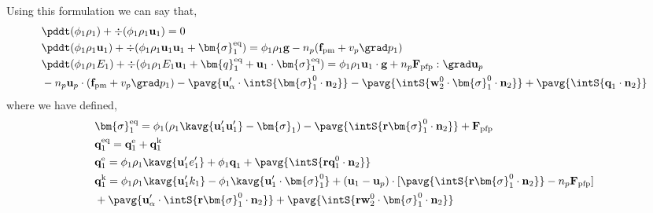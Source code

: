 Using this formulation we can say that, 
\begin{align}
    \label{eq:dt_avg_rho}
    &\pddt (\phi_1 \rho_1)  
    + \div (
        \phi_1 \rho_1\textbf{u}_1
    )
    = 
    0\\
    \label{eq:dt_avg_rhou_1}
    &\pddt (\phi_1 \rho_1\textbf{u}_1)  
    + \div (
        \phi_1 \rho_1\textbf{u}_1\textbf{u}_1
        + \bm{\sigma}_1^\text{eq}
    )
    = 
    \phi_1 \rho_1 \textbf{g} 
    - n_p (\textbf{f}_\text{pm} + v_p \grad p_1)
    \\
    \label{eq:dt_avg_rhoE_1}
    &\pddt (\phi_1\rho_1E_1)  
    + \div (
        \phi_1\rho_1E_1\textbf{u}_1
        + \bm{q}_1^\text{eq}
        + \textbf{u}_1 \cdot \bm{\sigma}_1^\text{eq}
        )
    = 
    \phi_1 \rho_1\textbf{u}_1 \cdot \textbf{g} 
    +n_p\textbf{F}_\text{pfp}:\grad \textbf{u}_p\\
    &
    - n_p \textbf{u}_p \cdot (\textbf{f}_\text{pm} + v_p \grad p_1)
    - \pavg{ \textbf{u}_\alpha' \cdot \intS{  \bm{\sigma}_1^0 \cdot \textbf{n}_2}}
    - \pavg{ \intS{\textbf{w}_2^0 \cdot \bm{\sigma}_1^0 \cdot \textbf{n}_2}}
    + \pavg{\intS{\textbf{q}_1\cdot \textbf{n}_2}}
\end{align} 
where we have defined, 
\begin{align*}
    &\bm{\sigma}_1^\text{eq}
    = \phi_1 (
        \rho_1\kavg{\textbf{u}_1'\textbf{u}_1'}
        -\bm{\sigma}_1%
        )  
        - \pavg{\intS{\textbf{r}\bm{\sigma}_1^0 \cdot \textbf{n}_2}}
        + \textbf{F}_\text{pfp}\\
    &\textbf{q}_1^\text{eq}
    =\textbf{q}_1^\text{e} +\textbf{q}_1^\text{k}  \\
    &\textbf{q}_1^\text{e}
    = \phi_1\rho_1 \kavg{\textbf{u}_1' e_1'} 
    + \phi_1\textbf{q}_1 
    +\pavg{\intS{\textbf{r}\textbf{q}_1^0 \cdot \textbf{n}_2}} 
    \\
    &\textbf{q}_1^\text{k}
    = \phi_1\rho_1 \kavg{\textbf{u}_1' k_1} 
    - \phi_1\kavg{\textbf{u}_1' \cdot \bm{\sigma}_1^0}
    + (\textbf{u}_1 - \textbf{u}_p)\cdot[
    \pavg{\intS{\textbf{r}\bm{\sigma}_1^0 \cdot \textbf{n}_2}}
     - n_p \textbf{F}_\text{pfp}]
    \\
    &+ \pavg{ \textbf{u}_\alpha' \cdot \intS{ \textbf{r} \bm{\sigma}_1^0 \cdot \textbf{n}_2}}
    + \pavg{ \intS{\textbf{r}\textbf{w}_2^0 \cdot \bm{\sigma}_1^0 \cdot \textbf{n}_2}}
\end{align*}
